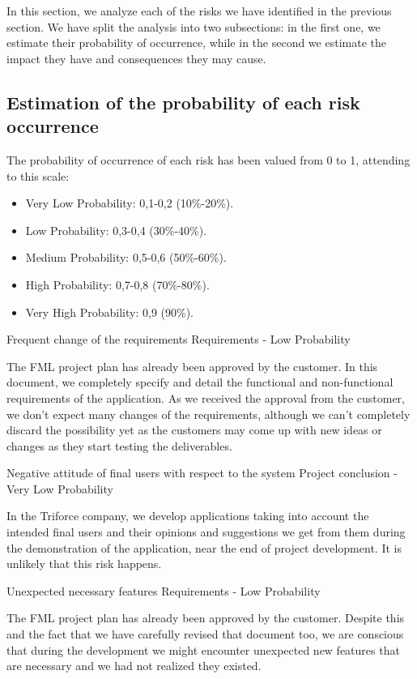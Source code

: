 
In this section, we analyze each of the risks we have identified in the previous section. We have split the analysis into two subsections: in the first one, we estimate their probability of occurrence, while in the second we estimate the impact they have and consequences they may cause.

\subsection{Estimation of the probability of each risk occurrence}
The probability of occurrence of each risk has been valued from 0 to 1, attending to this scale:
\begin{itemize}
\item Very Low Probability: 0,1-0,2 (10\%-20\%).
\item Low Probability: 0,3-0,4 (30\%-40\%).
\item Medium Probability: 0,5-0,6 (50\%-60\%).
\item High Probability: 0,7-0,8 (70\%-80\%).
\item Very High Probability: 0,9 (90\%).
\end{itemize}


\begin{risk}{Frequent change of the requirements}
\riskcat Requirements
 - Low Probability

The FML project plan has already been approved by the customer. In this document, we completely specify and detail the functional and non-functional requirements of the application. As we received the approval from the customer, we don't expect many changes of the requirements, although we can't completely discard the possibility yet as the customers may come up with new ideas or changes as they start testing the deliverables.
\end{risk}

\begin{risk}{Negative attitude of final users with respect to the system}
\riskcat Project conclusion
 - Very Low Probability

In the Triforce company, we develop applications taking into account the intended final users and their opinions and suggestions we get from them during the demonstration of the application, near the end of project development. It is unlikely that this risk happens.
\end{risk}

\begin{risk}{Unexpected necessary features}
\riskcat Requirements
 - Low Probability

The FML project plan has already been approved by the customer. Despite this and the fact that we have carefully revised that document too, we are conscious that during the development we might encounter unexpected new features that are necessary and we had not realized they existed.
\end{risk}

